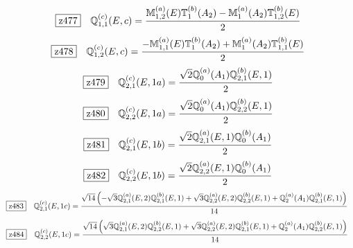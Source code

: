 \documentclass[fleqn,10pt,landscape]{jsarticle}
\begin{document}
\begin{dmath*}
\hspace*{3mm}\fbox{z477}\quad \mathbb{Q}_{1,1}^{(c)}(E,c)=\frac{\mathbb{M}_{1,2}^{(a)}(E) \mathbb{T}_{1}^{(b)}(A_{2}) - \mathbb{M}_{1}^{(a)}(A_{2}) \mathbb{T}_{1,2}^{(b)}(E)}{2}
\end{dmath*}
\begin{dmath*}
\hspace*{3mm}\fbox{z478}\quad \mathbb{Q}_{1,2}^{(c)}(E,c)=\frac{- \mathbb{M}_{1,1}^{(a)}(E) \mathbb{T}_{1}^{(b)}(A_{2}) + \mathbb{M}_{1}^{(a)}(A_{2}) \mathbb{T}_{1,1}^{(b)}(E)}{2}
\end{dmath*}
\begin{dmath*}
\hspace*{3mm}\fbox{z479}\quad \mathbb{Q}_{2,1}^{(c)}(E,1a)=\frac{\sqrt{2} \mathbb{Q}_{0}^{(a)}(A_{1}) \mathbb{Q}_{2,1}^{(b)}(E,1)}{2}
\end{dmath*}
\begin{dmath*}
\hspace*{3mm}\fbox{z480}\quad \mathbb{Q}_{2,2}^{(c)}(E,1a)=\frac{\sqrt{2} \mathbb{Q}_{0}^{(a)}(A_{1}) \mathbb{Q}_{2,2}^{(b)}(E,1)}{2}
\end{dmath*}
\begin{dmath*}
\hspace*{3mm}\fbox{z481}\quad \mathbb{Q}_{2,1}^{(c)}(E,1b)=\frac{\sqrt{2} \mathbb{Q}_{2,1}^{(a)}(E,1) \mathbb{Q}_{0}^{(b)}(A_{1})}{2}
\end{dmath*}
\begin{dmath*}
\hspace*{3mm}\fbox{z482}\quad \mathbb{Q}_{2,2}^{(c)}(E,1b)=\frac{\sqrt{2} \mathbb{Q}_{2,2}^{(a)}(E,1) \mathbb{Q}_{0}^{(b)}(A_{1})}{2}
\end{dmath*}
\begin{dmath*}
\hspace*{3mm}\fbox{z483}\quad \mathbb{Q}_{2,1}^{(c)}(E,1c)=\frac{\sqrt{14} \left(- \sqrt{3} \mathbb{Q}_{2,1}^{(a)}(E,2) \mathbb{Q}_{2,1}^{(b)}(E,1) + \sqrt{3} \mathbb{Q}_{2,2}^{(a)}(E,2) \mathbb{Q}_{2,2}^{(b)}(E,1) + \mathbb{Q}_{2}^{(a)}(A_{1}) \mathbb{Q}_{2,1}^{(b)}(E,1)\right)}{14}
\end{dmath*}
\begin{dmath*}
\hspace*{3mm}\fbox{z484}\quad \mathbb{Q}_{2,2}^{(c)}(E,1c)=\frac{\sqrt{14} \left(\sqrt{3} \mathbb{Q}_{2,1}^{(a)}(E,2) \mathbb{Q}_{2,2}^{(b)}(E,1) + \sqrt{3} \mathbb{Q}_{2,2}^{(a)}(E,2) \mathbb{Q}_{2,1}^{(b)}(E,1) + \mathbb{Q}_{2}^{(a)}(A_{1}) \mathbb{Q}_{2,2}^{(b)}(E,1)\right)}{14}
\end{dmath*}
\end{document}
